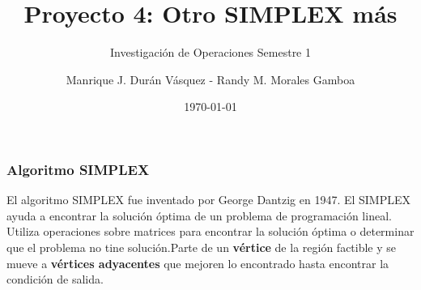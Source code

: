 \documentclass{beamer}
\title{Proyecto 4: Otro SIMPLEX m\'as}
\subtitle{Investigaci\'on de Operaciones \newline Semestre 1}
\author{Manrique J. Dur\'an V\'asquez - Randy M. Morales Gamboa}
\institute{Instituto Tecnol\'ogico de Costa Rica}
\date{\today}
\begin{document}
\begin{frame}
\maketitle
\end{frame}\begin{frame}
\frametitle{Algoritmo SIMPLEX}El algoritmo SIMPLEX fue inventado por George Dantzig en 1947. El SIMPLEX ayuda a encontrar la soluci\'on \'optima de un problema de programaci\'on lineal. Utiliza operaciones sobre matrices para encontrar la soluci\'on \'optima o determinar que el problema no tine soluci\'on.\newline Parte de un \textbf{v\'ertice} de la regi\'on factible y se mueve a \textbf{v\'ertices adyacentes} que mejoren lo encontrado hasta encontrar la condici\'on de salida.\end{frame}
\end{document}

